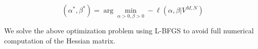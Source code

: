\documentclass[10pt,twocolumn,letterpaper]{article}
\begin{document}
\begin{equation}
(\alpha^* , \beta^*) = \arg \underset{\alpha>0, \beta>0}{\min} - \ell(\alpha, \beta | V^{M,N} )
\end{equation}
 
We solve the above optimization problem using L-BFGS to avoid full numerical computation of the Hessian matrix.


%
%
%
%
%
%
\end{document}
